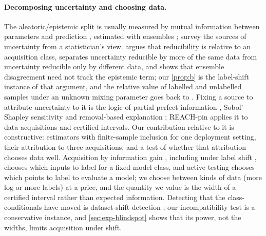\paragraph{Decomposing uncertainty and choosing data.} The aleatoric/epistemic split
\citep{hullermeier2021aleatoric} is usually measured by mutual information between parameters and
prediction \citep{depeweg2018decomposition}, estimated with ensembles \citep{lakshminarayanan2017simple};
\citet{gruber2023sources} survey the sources of uncertainty from a statistician's view.
\citet{young2026epistemic} argues that reducibility is relative to an acquisition class, separates
uncertainty reducible by more of the same data from uncertainty reducible only by different data,
and shows that ensemble disagreement need not track the epistemic term; our \cref{prop:b} is the
label-shift instance of that argument, and the relative value of labelled and unlabelled samples under an
unknown mixing parameter goes back to \citet{castelli1996relative}. Fixing a source to attribute uncertainty to it is the logic
of partial perfect information \citep{felli1998sensitivity}, Sobol'--Shapley sensitivity \citep{owen2014sobol}
and removal-based explanation \citep{covert2021explaining,watson2023explaining}; REACH-pin applies it to data
acquisitions and certified intervals. Our contribution relative to it is constructive: estimators
with finite-sample inclusion for one deployment setting, their attribution to three acquisitions,
and a test of whether that attribution chooses data well. Acquisition by information gain \citep{houlsby2011bayesian}, including under label shift
\citep{zhao2021active}, chooses which inputs to label for a fixed model class, and active testing
\citep{kossen2021active} chooses which points to label to evaluate a model; we choose between kinds of
data (more log or more labels) at a price, and the quantity we value is the width of a certified
interval rather than expected information. Detecting that the class-conditionals have moved is
dataset-shift detection \citep{rabanser2019failing}; our incompatibility test is a conservative instance,
and \cref{sec:exp-blindspot} shows that its power, not the widths, limits acquisition under shift.

